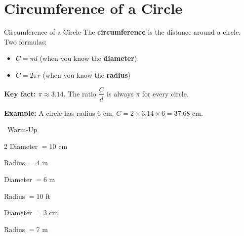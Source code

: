 \section{Circumference of a Circle}

\begin{quickReview}{Circumference of a Circle}
The \textbf{circumference} is the distance around a circle. Two formulas:

\begin{itemize}[leftmargin=*]
    \item $C = \pi d$ \quad (when you know the \textbf{diameter})
    \item $C = 2\pi r$ \quad (when you know the \textbf{radius})
\end{itemize}

\medskip
\textbf{Key fact:} $\pi \approx 3.14$. The ratio $\dfrac{C}{d}$ is always $\pi$ for every circle.

\smallskip
\textbf{Example:} A circle has radius $6$ cm. $C = 2 \times 3.14 \times 6 = 37.68$ cm.
\end{quickReview}

\begin{practiceBox}[funGreen]{\faSun~Warm-Up}


\begin{multicols}{2}
\prob Diameter $= 10$ cm \answerBlank[3cm]

\prob Radius $= 4$ in \answerBlank[3cm]

\prob Diameter $= 6$ m \answerBlank[3cm]

\prob Radius $= 10$ ft \answerBlank[3cm]

\prob Diameter $= 3$ cm \answerBlank[3cm]

\prob Radius $= 7$ m \answerBlank[3cm]
\end{multicols}
\end{practiceBox}

